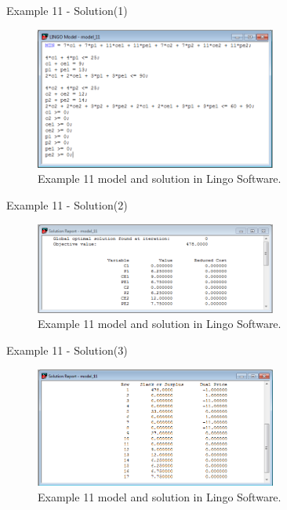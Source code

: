 \begin{frame}{Example 11 - Solution(1)}
\begin{figure}
    \includegraphics[width=300px]{slides/ex11/screenshot_a.png}
    \caption{Example 11 model and solution in Lingo Software.}
\end{figure}
\end{frame}

\begin{frame}{Example 11 - Solution(2)}
\begin{figure}
    \includegraphics[width=300px]{slides/ex11/screenshot_b.png}
    \caption{Example 11 model and solution in Lingo Software.}
\end{figure}
\end{frame}

\begin{frame}{Example 11 - Solution(3)}
\begin{figure}
    \includegraphics[width=300px]{slides/ex11/screenshot_c.png}
    \caption{Example 11 model and solution in Lingo Software.}
\end{figure}
\end{frame}


